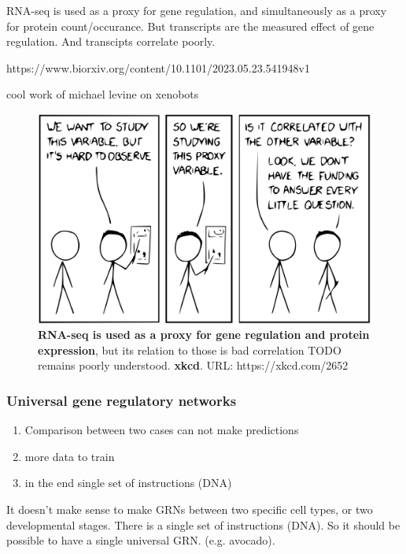 RNA-seq is used as a proxy for gene regulation, and simultaneously as a proxy for protein count/occurance. But transcripts are the measured effect of gene regulation. And transcipts correlate poorly.

https://www.biorxiv.org/content/10.1101/2023.05.23.541948v1

cool work of michael levine on xenobots


\begin{figure}[H]
    \includegraphics[width=\linewidth]{ch.discussion/imgs/xkcd.png}
    \caption{\textbf{RNA-seq is used as a proxy for gene regulation and protein expression}, but its relation to those is bad correlation TODO remains poorly understood. \textbf{xkcd}. URL: https://xkcd.com/2652}
    \label{fig:xkcd}
\end{figure}

\subsubsection{Universal gene regulatory networks}

\begin{enumerate}
    \item Comparison between two cases can not make predictions
    \item more data to train
    \item in the end single set of instructions (DNA)
\end{enumerate}

It doesn't make sense to make GRNs between two specific cell types, or two developmental stages. There is a single set of instructions (DNA). So it should be possible to have a single universal GRN. (e.g. avocado).

